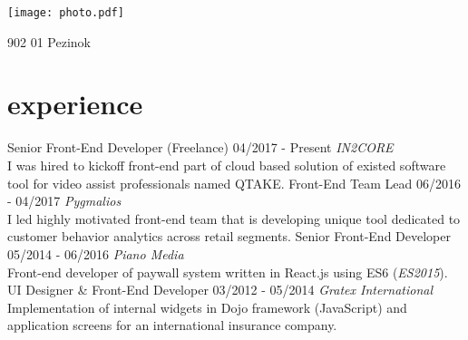 \documentclass[a4paper]{cv}
\begin{document}


\begin{aside}
	\texttt{[image: photo.pdf]}
	\address{Banícka 21}{902 01 Pezinok}
	\section{\vspace{5mm}      }
\end{aside}

\section{experience}
\begin{entrylist}
	\entry
		{Senior Front-End Developer (Freelance)}
		{04/2017 - Present}
		{\emph{IN2CORE}\\
		I was hired to kickoff front-end part of cloud based solution of existed software tool for video assist professionals named QTAKE.}
	\entry
		{Front-End Team Lead}
		{06/2016 - 04/2017}
		{\emph{Pygmalios}\\
		I led highly motivated front-end team that is developing unique tool dedicated to customer behavior analytics across retail segments.}
	\entry
		{Senior Front-End Developer}
		{05/2014 - 06/2016}
		{\emph{Piano Media}\\
		Front-end developer of paywall system written in React.js using ES6 ({\emph{ES2015}}).}
	\entry
		{UI Designer \& Front-End Developer}
		{03/2012 - 05/2014}
		{\emph{Gratex International}\\
		Implementation of internal widgets in Dojo framework (JavaScript) and application screens for an international insurance company.}
\end{entrylist}
\end{document}
